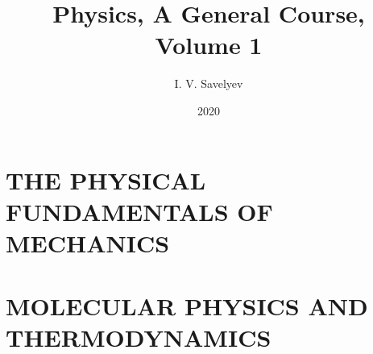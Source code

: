 \documentclass[11pt, twoside, fleqn]{book}
\title{Physics, A General Course, Volume 1}
\author{I. V. Savelyev}
\date{2020}
\numberwithin{equation}{chapter}
\begin{document}
\setlength{\abovedisplayskip}{3pt}
\setlength{\belowdisplayskip}{3pt}
\setlength{\abovedisplayshortskip}{3pt}
\setlength{\belowdisplayshortskip}{3pt}

\frontmatter


\cleardoublepage

\cleardoublepage

\cleardoublepage
{\hypersetup{linkcolor=black!80}
	\tableofcontents
}
\cleardoublepage

\mainmatter


\cleardoublepage

\part{THE PHYSICAL FUNDAMENTALS OF MECHANICS}\label{part:A}
\cleardoublepage

\cleardoublepage

\cleardoublepage

\cleardoublepage

\cleardoublepage

\cleardoublepage

\cleardoublepage

\cleardoublepage

\cleardoublepage


\part{MOLECULAR PHYSICS AND THERMODYNAMICS}\label{part:B}
\cleardoublepage

\cleardoublepage

\cleardoublepage

\cleardoublepage

\cleardoublepage

\cleardoublepage

\cleardoublepage

\cleardoublepage


\cleardoublepage

\end{document}
